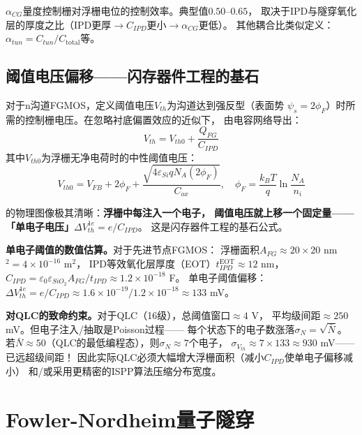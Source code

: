 \documentclass[11pt,a4paper,openany]{book}
\theoremstyle{definition}
\theoremstyle{plain}
\theoremstyle{remark}
\begin{document}
$\alpha_{CG}$量度控制栅对浮栅电位的控制效率。典型值$0.50$--$0.65$，
取决于IPD与隧穿氧化层的厚度之比（IPD更厚$\to C_{IPD}$更小$\to \alpha_{CG}$更低）。
其他耦合比类似定义：$\alpha_{tun} = C_{tun}/C_{\text{total}}$等。

\subsection{阈值电压偏移——闪存器件工程的基石}

对于n沟道FGMOS，定义阈值电压$V_{th}$为沟道达到强反型（表面势
$\psi_s = 2\phi_F$）时所需的控制栅电压。在忽略衬底偏置效应的近似下，
由电容网络导出：
\begin{equation}\label{eq:vth-fg}
  \boxed{ V_{th} = V_{th0} + \frac{Q_{FG}}{C_{IPD}} }
\end{equation}
其中$V_{th0}$为浮栅无净电荷时的中性阈值电压：
\begin{equation}
  V_{th0} = V_{FB} + 2\phi_F + \frac{\sqrt{4\varepsilon_{Si}qN_A(2\phi_F)}}{C_{ox}},
  \quad \phi_F = \frac{k_B T}{q}\ln\frac{N_A}{n_i}
\end{equation}

的物理图像极其清晰：\textbf{浮栅中每注入一个电子，
阈值电压就上移一个固定量——「单电子电压」$\Delta V_{th}^{1e} = e / C_{IPD}$}。
这是闪存器件工程的基石公式。

\begin{physbox}
\textbf{单电子阈值的数值估算。}对于先进节点FGMOS：
浮栅面积$A_{FG} \approx 20 \times 20$ nm$^2 = 4 \times 10^{-16}$ m$^2$，
IPD等效氧化层厚度（EOT）$t_{IPD}^{\text{EOT}} \approx 12$ nm，
$C_{IPD} = \varepsilon_0\varepsilon_{SiO_2}A_{FG}/t_{IPD} \approx 1.2 \times 10^{-18}$ F。
单电子阈值偏移：$\Delta V_{th}^{1e} = e/C_{IPD} \approx 1.6\times 10^{-19} / 1.2\times 10^{-18} \approx 133$ mV。

\textbf{对QLC的致命约束。}对于QLC（16级），总阈值窗口$\approx 4$ V，
平均级间距$\approx 250$ mV。但电子注入/抽取是Poisson过程——
每个状态下的电子数涨落$\sigma_N = \sqrt{\bar{N}}$。
若$\bar{N} \approx 50$（QLC的最低编程态），则$\sigma_N \approx 7$个电子，
$\sigma_{V_{th}} \approx 7 \times 133 \approx 930$ mV——已远超级间距！
因此实际QLC必须大幅增大浮栅面积（减小$C_{IPD}$使单电子偏移减小）
和/或采用更精密的ISPP算法压缩分布宽度。
\end{physbox}

\section{Fowler-Nordheim量子隧穿}
\end{document}
